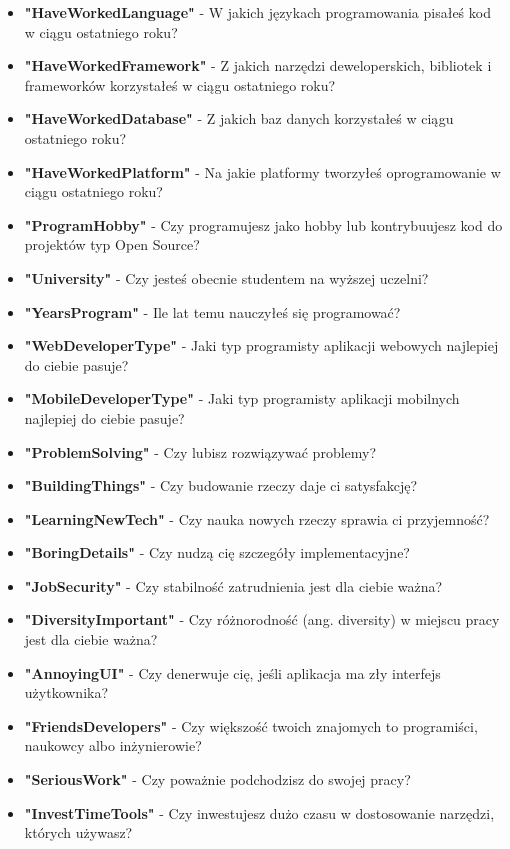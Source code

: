 \begin{appendices}
\begin{itemize}
        \item \textbf{"HaveWorkedLanguage"} - W jakich językach programowania pisałeś kod w ciągu ostatniego roku?
        \item \textbf{"HaveWorkedFramework"} - Z jakich narzędzi deweloperskich, bibliotek i frameworków korzystałeś w ciągu ostatniego roku?
        \item \textbf{"HaveWorkedDatabase"} - Z jakich baz danych korzystałeś w ciągu ostatniego roku?
        \item \textbf{"HaveWorkedPlatform"} - Na jakie platformy tworzyłeś oprogramowanie w ciągu ostatniego roku?
        \item \textbf{"ProgramHobby"} - Czy programujesz jako hobby lub kontrybuujesz kod do projektów typ Open Source?
        \item \textbf{"University"} - Czy jesteś obecnie studentem na wyższej uczelni?
        \item \textbf{"YearsProgram"} - Ile lat temu nauczyłeś się programować?
        \item \textbf{"WebDeveloperType"} - Jaki typ programisty aplikacji webowych najlepiej do ciebie pasuje?
        \item \textbf{"MobileDeveloperType"} - Jaki typ programisty aplikacji mobilnych najlepiej do ciebie pasuje?
        \item \textbf{"ProblemSolving"} - Czy lubisz rozwiązywać problemy?
        \item \textbf{"BuildingThings"} - Czy budowanie rzeczy daje ci satysfakcję?
        \item \textbf{"LearningNewTech"} - Czy nauka nowych rzeczy sprawia ci przyjemność?
        \item \textbf{"BoringDetails"} - Czy nudzą cię szczegóły implementacyjne?
        \item \textbf{"JobSecurity"} - Czy stabilność zatrudnienia jest dla ciebie ważna?
        \item \textbf{"DiversityImportant"} - Czy różnorodność (ang. diversity) w miejscu pracy jest dla ciebie ważna?
        \item \textbf{"AnnoyingUI"} - Czy denerwuje cię, jeśli aplikacja ma zły interfejs użytkownika?
        \item \textbf{"FriendsDevelopers"} - Czy większość twoich znajomych to programiści, naukowcy albo inżynierowie?
        \item \textbf{"SeriousWork"} - Czy poważnie podchodzisz do swojej pracy?
        \item \textbf{"InvestTimeTools"} - Czy inwestujesz dużo czasu w dostosowanie narzędzi, których używasz?

\end{itemize}
\end{appendices}
